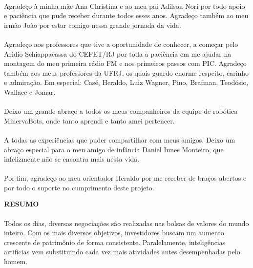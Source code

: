 \paragraph{} Agradeço à minha mãe Ana Christina e ao meu pai Adilson Nori por todo apoio e paciência que pude receber durante todos esses anos. Agradeço também ao meu irmão João por estar comigo nessa grande jornada da vida.

\paragraph{} Agradeço aos professores que tive a oportunidade de conhecer, a começar pelo Aridio Schiappacassa do CEFET/RJ por toda a paciência em me ajudar na montagem do meu primeira rádio FM e nos primeiros passos com PIC. Agradeço também aos meus professores da UFRJ, os quais guardo enorme respeito, carinho e admiração. Em especial: Casé, Heraldo, Luiz Wagner, Pino, Brafman, Teodósio, Wallace e Jomar.

\paragraph{} Deixo um grande abraço a todos os meus companheiros da equipe de robótica MinervaBots, onde tanto aprendi e tanto amei pertencer.

\paragraph{} A todas as experiências que puder compartilhar com meus amigos. Deixo um abraço especial para o meu amigo de infância Daniel Iunes Monteiro,  que infelizmente não se encontra mais nesta vida.

\paragraph{} Por fim, agradeço ao meu orientador Heraldo por me receber de braços abertos e por todo o suporte no cumprimento deste projeto.

\pagebreak


\begin{center}
\textbf{RESUMO}
\end{center}
      \vspace{0.5cm}

\paragraph{} Todos os dias, diversas negociações são realizadas nas bolsas de valores do mundo inteiro. Com os mais diversos objetivos, investidores buscam um aumento crescente de patrimônio de forma consistente. Paralelamente, inteligências artificias vem substituindo cada vez mais atividades antes desempenhadas pelo homem.


